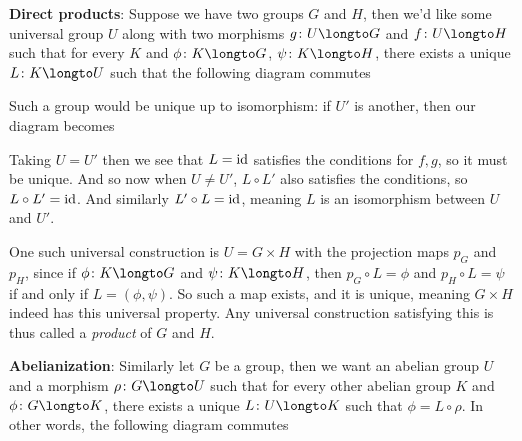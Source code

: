 {\bf Direct products}:
Suppose we have two groups $G$ and $H$, then we'd like some universal group $U$ along with two morphisms $g\colon U\longto G$ and $f\colon U\longto H$ such that for every $K$ and $\phi\colon K\longto G$,
$\psi\colon K\longto H$, there exists a unique $L\colon K\longto U$ such that the following diagram commutes

\centerline{\def\diagcolwidth{1cm}\def\diagrowheight{.75cm}}

Such a group would be unique up to isomorphism: if $U'$ is another, then our diagram becomes

\centerline{\def\diagcolwidth{1cm}\def\diagrowheight{.75cm}}

Taking $U=U'$ then we see that $L={\rm id}$ satisfies the conditions for $f,g$, so it must be unique.
And so now when $U\neq U'$, $L\circ L'$ also satisfies the conditions, so $L\circ L'={\rm id}$.
And similarly $L'\circ L={\rm id}$, meaning $L$ is an isomorphism between $U$ and $U'$.

One such universal construction is $U=G\times H$ with the projection maps $p_G$ and $p_H$, since if $\phi\colon K\longto G$ and $\psi\colon K\longto H$, then $p_G\circ L=\phi$ and $p_H\circ L=\psi$ if and
only if $L=(\phi,\psi)$.
So such a map exists, and it is unique, meaning $G\times H$ indeed has this universal property.
Any universal construction satisfying this is thus called a {\it product} of $G$ and $H$.

\medskip
{\bf Abelianization}:
Similarly let $G$ be a group, then we want an abelian group $U$ and a morphism $\rho\colon G\longto U$ such that for every other abelian group $K$ and $\phi\colon G\longto K$, there exists a unique
$L\colon U\longto K$ such that $\phi=L\circ\rho$.
In other words, the following diagram commutes


